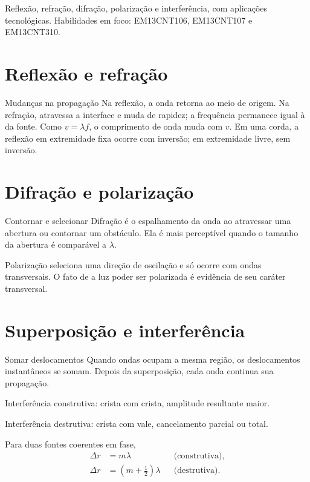 \documentclass{notaaula}
\begin{document}
        \cabecalho

        \begin{sobre}
        Reflexão, refração, difração, polarização e interferência, com aplicações tecnológicas. Habilidades em foco: EM13CNT106, EM13CNT107 e EM13CNT310.
        \end{sobre}

        \section{Reflexão e refração}

\begin{copiar}{Mudanças na propagação}
Na reflexão, a onda retorna ao meio de origem. Na refração, atravessa a interface e muda de rapidez;
a frequência permanece igual à da fonte. Como $v=\lambda f$, o comprimento de onda muda com $v$.
Em uma corda, a reflexão em extremidade fixa ocorre com inversão; em extremidade livre, sem inversão.
\end{copiar}

\section{Difração e polarização}

\begin{copiar}{Contornar e selecionar}
Difração é o espalhamento da onda ao atravessar uma abertura ou contornar um obstáculo. Ela é mais
perceptível quando o tamanho da abertura é comparável a $\lambda$.

Polarização seleciona uma direção de oscilação e só ocorre com ondas transversais. O fato de a luz
poder ser polarizada é evidência de seu caráter transversal.
\end{copiar}

\section{Superposição e interferência}

\begin{copiar}{Somar deslocamentos}
Quando ondas ocupam a mesma região, os deslocamentos instantâneos se somam. Depois da superposição,
cada onda continua sua propagação.
\begin{itens}
\item Interferência construtiva: crista com crista, amplitude resultante maior.
\item Interferência destrutiva: crista com vale, cancelamento parcial ou total.
\end{itens}
Para duas fontes coerentes em fase,
\[
  \begin{aligned}
  \Delta r&=m\lambda &&\text{(construtiva)},\\
  \Delta r&=\left(m+\frac12\right)\lambda &&\text{(destrutiva)}.
  \end{aligned}
\]
\end{copiar}
\end{document}
